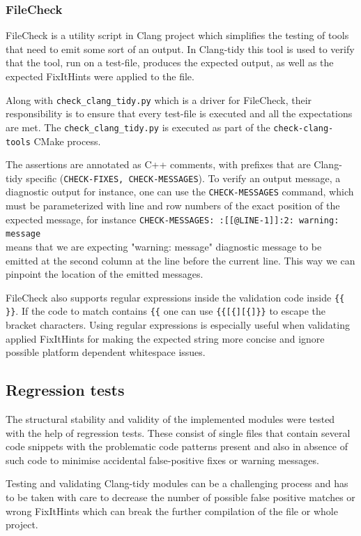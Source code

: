 \subsubsection{FileCheck}
\par FileCheck is a utility script in Clang project which simplifies the testing of tools that need to emit some sort of an output\cite{filecheck_docs}. In Clang-tidy this tool is used to verify that the tool, run on a test-file, produces the expected output, as well as the expected FixItHints were applied to the file. \medskip
\par Along with \verb|check_clang_tidy.py| which is a driver for FileCheck, their responsibility is to ensure that every test-file is executed and all the expectations are met. The \verb|check_clang_tidy.py| is executed as part of the \verb|check-clang-tools| CMake process. \medskip
\par The assertions are annotated as C++ comments, with prefixes that are Clang-tidy specific (\verb|CHECK-FIXES, CHECK-MESSAGES|). To verify an output message, a diagnostic output for instance, one can use the \verb|CHECK-MESSAGES| command, which must be parameterized with line and row numbers of the exact position of the expected message, for instance \verb|CHECK-MESSAGES: :[[@LINE-1]]:2: warning: message|\\ means that we are expecting "warning: message" diagnostic message to be emitted at the second column at the line before the current line. This way we can pinpoint the location of the emitted messages. \medskip
\par FileCheck also supports regular expressions inside the validation code inside \verb|{{ }}|. If the code to match contains \verb|{{| one can use \verb|{{[{][{]}}| to escape the bracket characters. Using regular expressions is especially useful when validating applied FixItHints for making the expected string more concise and ignore possible platform dependent whitespace issues.
\subsection{Regression tests}
\par The structural stability and validity of the implemented modules were tested with the help of regression tests. These consist of single files that contain several code snippets with the problematic code patterns present and also in absence of such code to minimise accidental false-positive fixes or warning messages.
\par Testing and validating Clang-tidy modules can be a challenging process and has to be taken with care to decrease the number of possible false positive matches or wrong FixItHints which can break the further compilation of the file or whole project.
